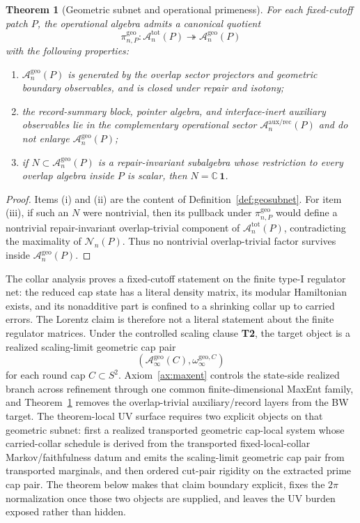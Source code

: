 \documentclass[11pt]{article}
\newtheorem{theorem}{Theorem}[section]
\begin{document}
\begin{theorem}[Geometric subnet and operational primeness]\label{thm:geosubnet}
For each fixed-cutoff patch \(P\), the operational algebra admits a canonical quotient
\[
\pi_{n,P}^{\mathrm{geo}}:\mathcal A_n^{\mathrm{tot}}(P)\twoheadrightarrow \mathcal A_n^{\mathrm{geo}}(P)
\]
with the following properties:
\begin{enumerate}[label=\textup{(\roman*)},leftmargin=2em]
\item \(\mathcal A_n^{\mathrm{geo}}(P)\) is generated by the overlap sector projectors and geometric boundary observables, and is closed under repair and isotony;
\item the record-summary block, pointer algebra, and interface-inert auxiliary observables lie in the complementary operational sector \(\mathcal A_n^{\mathrm{aux/rec}}(P)\) and do not enlarge \(\mathcal A_n^{\mathrm{geo}}(P)\);
\item if \(N\subset \mathcal A_n^{\mathrm{geo}}(P)\) is a repair-invariant subalgebra whose restriction to every overlap algebra inside \(P\) is scalar, then \(N=\mathbb C\,\mathbf 1\).
\end{enumerate}
\end{theorem}

\begin{proof}
Items \textup{(i)} and \textup{(ii)} are the content of Definition~\ref{def:geosubnet}. For item \textup{(iii)}, if such an \(N\) were nontrivial, then its pullback under \(\pi_{n,P}^{\mathrm{geo}}\) would define a nontrivial repair-invariant overlap-trivial component of \(\mathcal A_n^{\mathrm{tot}}(P)\), contradicting the maximality of \(\mathcal N_n(P)\). Thus no nontrivial overlap-trivial factor survives inside \(\mathcal A_n^{\mathrm{geo}}(P)\).
\end{proof}

The collar analysis proves a fixed-cutoff statement on the finite type-I regulator net: the reduced cap state has a literal density matrix, its modular Hamiltonian exists, and its nonadditive part is confined to a shrinking collar up to carried errors. The Lorentz claim is therefore not a literal statement about the finite regulator matrices. Under the controlled scaling clause \textbf{T2}, the target object is a realized scaling-limit geometric cap pair
\[
(\mathcal A_\infty^{\mathrm{geo}}(C),\omega_\infty^{\mathrm{geo},C})
\]
for each round cap \(C\subset S^2\). Axiom~\ref{ax:maxent} controls the state-side realized branch across refinement through one common finite-dimensional MaxEnt family, and Theorem~\ref{thm:geosubnet} removes the overlap-trivial auxiliary/record layers from the BW target. The theorem-local UV surface requires two explicit objects on that geometric subnet: first a realized transported geometric cap-local system whose carried-collar schedule is derived from the transported fixed-local-collar Markov/faithfulness datum and emits the scaling-limit geometric cap pair from transported marginals, and then ordered cut-pair rigidity on the extracted prime cap pair. The theorem below makes that claim boundary explicit, fixes the \(2\pi\) normalization once those two objects are supplied, and leaves the UV burden exposed rather than hidden.
\end{document}
